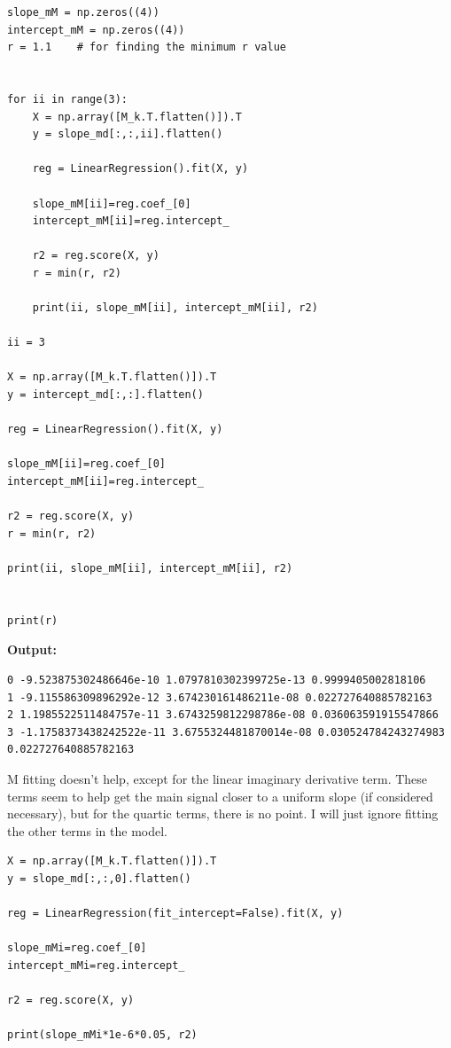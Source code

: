 \documentclass{article}
\begin{document}
\begin{lstlisting}
slope_mM = np.zeros((4))
intercept_mM = np.zeros((4))
r = 1.1    # for finding the minimum r value


for ii in range(3):
    X = np.array([M_k.T.flatten()]).T
    y = slope_md[:,:,ii].flatten()

    reg = LinearRegression().fit(X, y)

    slope_mM[ii]=reg.coef_[0]
    intercept_mM[ii]=reg.intercept_

    r2 = reg.score(X, y)
    r = min(r, r2)

    print(ii, slope_mM[ii], intercept_mM[ii], r2)

ii = 3

X = np.array([M_k.T.flatten()]).T
y = intercept_md[:,:].flatten()

reg = LinearRegression().fit(X, y)

slope_mM[ii]=reg.coef_[0]
intercept_mM[ii]=reg.intercept_

r2 = reg.score(X, y)
r = min(r, r2)

print(ii, slope_mM[ii], intercept_mM[ii], r2)


print(r)\end{lstlisting}

\textbf{Output:}\begin{verbatim}
0 -9.523875302486646e-10 1.0797810302399725e-13 0.9999405002818106
1 -9.115586309896292e-12 3.674230161486211e-08 0.022727640885782163
2 1.1985522511484757e-11 3.6743259812298786e-08 0.036063591915547866
3 -1.1758373438242522e-11 3.6755324481870014e-08 0.030524784243274983
0.022727640885782163

\end{verbatim}

M fitting doesn't help, except for the linear imaginary derivative term. These terms seem to help get the main signal closer to a uniform slope (if considered necessary), but for the quartic terms, there is no point. I will just ignore fitting the other terms in the model.

\begin{lstlisting}
X = np.array([M_k.T.flatten()]).T
y = slope_md[:,:,0].flatten()

reg = LinearRegression(fit_intercept=False).fit(X, y)

slope_mMi=reg.coef_[0]
intercept_mMi=reg.intercept_

r2 = reg.score(X, y)

print(slope_mMi*1e-6*0.05, r2)\end{lstlisting}
\end{document}
